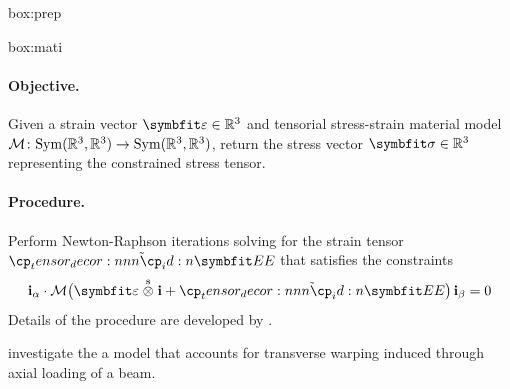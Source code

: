 \begin{ambox}{box:prep}
\begin{enumerate}
\begin{itemize}
    \end{itemize}
\end{enumerate}
\end{ambox}

\iftrue
\begin{ambox}{box:mati}
\paragraph{Objective.}
Given a strain vector \(\StrainVector \in \mathbb{R}^3\) and tensorial stress-strain material model \(\mathcal{M} \colon \mathrm{Sym}(\mathbb{R}^3, \mathbb{R}^3) \rightarrow \mathrm{Sym}(\mathbb{R}^3, \mathbb{R}^3)\), return the stress vector \(\StressVector \in \mathbb{R}^3\) representing the constrained stress tensor.
\paragraph{Procedure.}
Perform Newton-Raphson iterations solving for the strain tensor \(\tilde{\StrainTensor}\) that satisfies the constraints
\[
\FrameBasis_{\alpha}\cdot  \TensorMaterial\bigl(\StrainVector \symbun \FrameBasis + \tilde{\StrainTensor} \bigr)\, \FrameBasis_{\beta} = 0
\]
Details of the procedure are developed by \cite{klinkel2002using}.
\end{ambox}
\fi 


\cite{chadha2019comprehensive} investigate the a model that accounts for transverse warping induced through axial loading of a beam.

